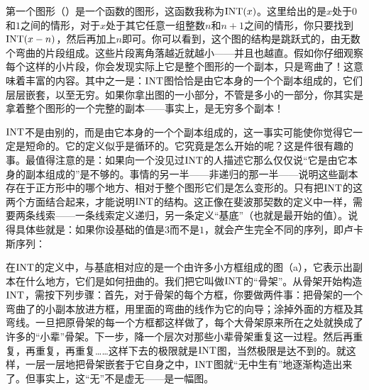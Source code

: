 第一个图形（）是一个函数的图形，这函数我称为$\operatorname{INT}(x)$。这里给出的是$x$处于$0$和$1$之间的情形，对于$x$处于其它任意一组整数$n$和$n+1$之间的情形，你只要找到$\operatorname{INT}(x-n)$，然后再加上$n$即可。你可以看到，这个图的结构是跳跃式的，由无数个弯曲的片段组成。这些片段离角落越近就越小——并且也越直。假如你仔细观察每个这样的小片段，你会发现实际上它是整个图形的一个副本，只是弯曲了！这意味着丰富的内容。其中之一是：$\operatorname{INT}$图恰恰是由它本身的一个个副本组成的，它们层层嵌套，以至无穷。如果你拿出图的一小部分，不管是多小的一部分，你其实是拿着整个图形的一个完整的副本——事实上，是无穷多个副本！

$\operatorname{INT}$不是由别的，而是由它本身的一个个副本组成的，这一事实可能使你觉得它一定是短命的。它的定义似乎是循环的。它究竟是怎么开始的呢？这是件很有趣的事。最值得注意的是：如果向一个没见过$\operatorname{INT}$的人描述它那么仅仅说“它是由它本身的副本组成的”是不够的。事情的另一半——非递归的那一半——说明这些副本存在于正方形中的哪个地方、相对于整个图形它们是怎么变形的。只有把$\operatorname{INT}$的这两个方面结合起来，才能说明$\operatorname{INT}$的结构。这正像在斐波那契数的定义中一样，需要两条线索——一条线索定义递归，另一条定义“基底”（也就是最开始的值）。说得具体些就是：如果你设基础的值是$3$而不是$1$，就会产生完全不同的序列，即卢卡斯序列：
\begin{center}
\end{center}

在$\operatorname{INT}$的定义中，与基底相对应的是一个由许多小方框组成的图（a），它表示出副本在什么地方，它们是如何扭曲的。我们把它叫做$\operatorname{INT}$的“骨架”。从骨架开始构造$\operatorname{INT}$，需按下列步骤：首先，对于骨架的每个方框，你要做两件事：把骨架的一个弯曲了的小副本放进方框，用里面的弯曲的线作为它的向导；涂掉外面的方框及其弯线。一旦把原骨架的每一个方框都这样做了，每个大骨架原来所在之处就换成了许多的“小辈”骨架。下一步，降一个层次对那些小辈骨架重复这一过程。然后再重复，再重复，再重复……这样下去的极限就是$\operatorname{INT}$图，当然极限是达不到的。就这样，一层一层地把骨架嵌套于它自身之中，$\operatorname{INT}$图就“无中生有”地逐渐构造出来了。但事实上，这“无”不是虚无——是一幅图。

